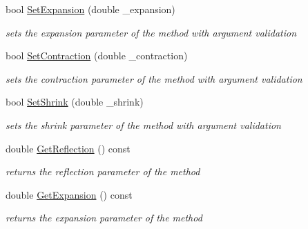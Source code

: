 \begin{DoxyCompactItemize}
bool \hyperlink{class_nelder_mead_a07345c18aa9b15bf061b7b040cb1c485}{Set\+Expansion} (double \+\_\+expansion)
\begin{DoxyCompactList}\small\item\em sets the expansion parameter of the method with argument validation \end{DoxyCompactList}\item 
\mbox{\label{class_nelder_mead_a1ecc71f01ee28a75efa27addb041670e}} 
bool \hyperlink{class_nelder_mead_a1ecc71f01ee28a75efa27addb041670e}{Set\+Contraction} (double \+\_\+contraction)
\begin{DoxyCompactList}\small\item\em sets the contraction parameter of the method with argument validation \end{DoxyCompactList}\item 
\mbox{\label{class_nelder_mead_a93d6e7b0cc0fdec157a7975c52c2da80}} 
bool \hyperlink{class_nelder_mead_a93d6e7b0cc0fdec157a7975c52c2da80}{Set\+Shrink} (double \+\_\+shrink)
\begin{DoxyCompactList}\small\item\em sets the shrink parameter of the method with argument validation \end{DoxyCompactList}\item 
\mbox{\label{class_nelder_mead_a8ef919184e1d3da6c126d1edf56162b2}} 
double \hyperlink{class_nelder_mead_a8ef919184e1d3da6c126d1edf56162b2}{Get\+Reflection} () const
\begin{DoxyCompactList}\small\item\em returns the reflection parameter of the method \end{DoxyCompactList}\item 
\mbox{\label{class_nelder_mead_a819eb62e9a97129acb690753ddae7c0f}} 
double \hyperlink{class_nelder_mead_a819eb62e9a97129acb690753ddae7c0f}{Get\+Expansion} () const
\begin{DoxyCompactList}\small\item\em returns the expansion parameter of the method \end{DoxyCompactList}\item 
\mbox{\label{class_nelder_mead_a1b370090db3d9b58a662eab50a6ed3c9}} 

\end{DoxyCompactItemize}
